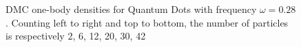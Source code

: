 \begin{figure}
\begin{center}
  \caption{DMC one-body densities for Quantum Dots with frequency $\omega=0.28$. Counting left to right and top to bottom, the number of particles is respectively 2, 6, 12, 20, 30, 42}
  \label{fig:OBD_DMC_QDOTS_w028}
 \end{center}
\end{figure}


\begin{figure}
 \begin{center}
   \\

\end{center}
\end{figure}
